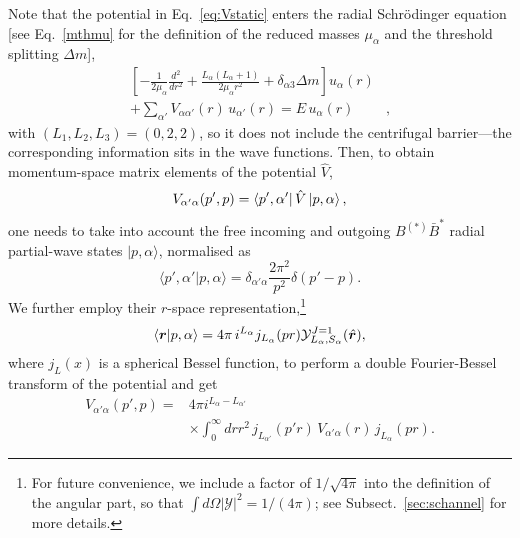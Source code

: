 \documentclass[aps,prd,showpacs,amsmath,twocolumn,superscriptaddress,floatfix,nofootinbib,notitlepage]{revtex4-2}
\newcommand{\ver}{{\bm r}}
\newcommand{\be}{\begin{equation}}
\newcommand{\ee}{\end{equation}}
\begin{document}
Note that the potential in Eq.~\eqref{eq:Vstatic} enters the radial Schr{\"o}dinger equation [see Eq.~\eqref{mthmu} for the definition of the reduced masses $\mu_\alpha$ and the threshold splitting $\Delta m$],
\be
\begin{split} 
{\left[-\frac{1}{2 \mu_\alpha} \frac{d^2}{d r^2}+\frac{L_\alpha\left(L_\alpha+1\right)}{2 \mu_\alpha r^2}+\delta_{\alpha 3} \Delta m\right] u_\alpha(r)} & \\ +\sum_{\alpha'} V_{\alpha \alpha'}(r)\, u_{\alpha'}(r)=E \, u_\alpha(r)&,
\end{split}
\ee
with $\left(L_1, L_2,L_3\right)=(0,2,2)$, so it
does not include the centrifugal barrier---the corresponding information sits in the wave functions. 
Then, to obtain momentum-space matrix elements of the potential $\hat{V}$, 
\be 
V_{\alpha'\alpha}(p',p)=\bra{p',\alpha'}\hat{V}\ket{p,\alpha},
\ee
one needs to take into account the free incoming and outgoing $B^{(*)}\bar{B}^*$ radial partial-wave states $|p,\alpha\rangle$,
normalised as 
\be
\langle p',\alpha'|p,\alpha\rangle
=\delta_{\alpha'\alpha}\frac{2\pi^2}{p^2}\delta(p'-p).
\label{eq:pLket}
\ee
We further employ their $r$-space representation,\footnote{For future convenience, we include a factor of $1/\sqrt{4\pi}$ into the definition of the angular part, so that $\int d\Omega |{\mathcal Y}|^2=1/(4\pi)$; see Subsect.~\ref{sec:schannel} for more details.}
\be
\braket{\ver|p,\alpha}
=4\pi\,i^{L_\alpha}j_{L_\alpha}(pr)
\mathcal{Y}^{J=1}_{L_\alpha,S_\alpha}(\hat{\ver}),
\label{eq:pw-free-coordinate}
\ee
where $j_{L}(x)$ is a spherical Bessel function, to perform a double Fourier-Bessel transform of the potential and get
\begin{align}\nonumber
V_{\alpha' \alpha}(p', p) ={}&4\pi i^{L_\alpha - L_{\alpha'}} \\
&\times\!\! \int_0^\infty \!\!\!\! dr r^2 \, j_{L_{\alpha'}}\!(p'r)\, V_{\alpha' \alpha}(r) \, j_{L_\alpha}\!(pr).
\label{eq:Vlocal-Bessel}
\end{align}
\end{document}

